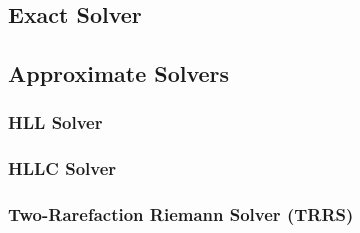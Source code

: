 

















\subsection{Exact Solver}









\subsection{Approximate Solvers}



\subsubsection{HLL Solver}


\subsubsection{HLLC Solver}


\subsubsection{Two-Rarefaction Riemann Solver (TRRS)}


